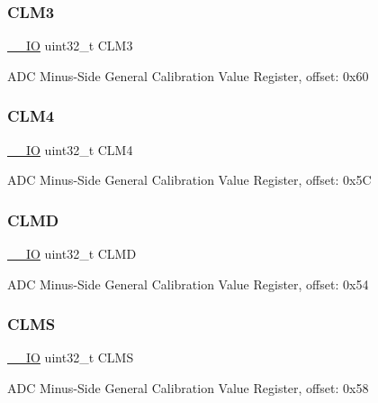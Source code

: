 \subsubsection{\texorpdfstring{CLM3}{CLM3}}
{\footnotesize\ttfamily \mbox{\hyperlink{core__cm0plus_8h_aec43007d9998a0a0e01faede4133d6be}{\+\_\+\+\_\+\+IO}} uint32\+\_\+t C\+L\+M3}

A\+DC Minus-\/\+Side General Calibration Value Register, offset\+: 0x60 \mbox{\label{struct_a_d_c___type_ae20cd4616d206938dcbdd0d89294a1c5}} 
\subsubsection{\texorpdfstring{CLM4}{CLM4}}
{\footnotesize\ttfamily \mbox{\hyperlink{core__cm0plus_8h_aec43007d9998a0a0e01faede4133d6be}{\+\_\+\+\_\+\+IO}} uint32\+\_\+t C\+L\+M4}

A\+DC Minus-\/\+Side General Calibration Value Register, offset\+: 0x5C \mbox{\label{struct_a_d_c___type_addad8cc46860498791a191bb20eaabee}} 
\subsubsection{\texorpdfstring{CLMD}{CLMD}}
{\footnotesize\ttfamily \mbox{\hyperlink{core__cm0plus_8h_aec43007d9998a0a0e01faede4133d6be}{\+\_\+\+\_\+\+IO}} uint32\+\_\+t C\+L\+MD}

A\+DC Minus-\/\+Side General Calibration Value Register, offset\+: 0x54 \mbox{\label{struct_a_d_c___type_a58148ff5ccf31e3492e95fefe99ada53}} 
\subsubsection{\texorpdfstring{CLMS}{CLMS}}
{\footnotesize\ttfamily \mbox{\hyperlink{core__cm0plus_8h_aec43007d9998a0a0e01faede4133d6be}{\+\_\+\+\_\+\+IO}} uint32\+\_\+t C\+L\+MS}

A\+DC Minus-\/\+Side General Calibration Value Register, offset\+: 0x58 \mbox{\label{struct_a_d_c___type_a01995af9e111222e08476c9aee76677c}} 
